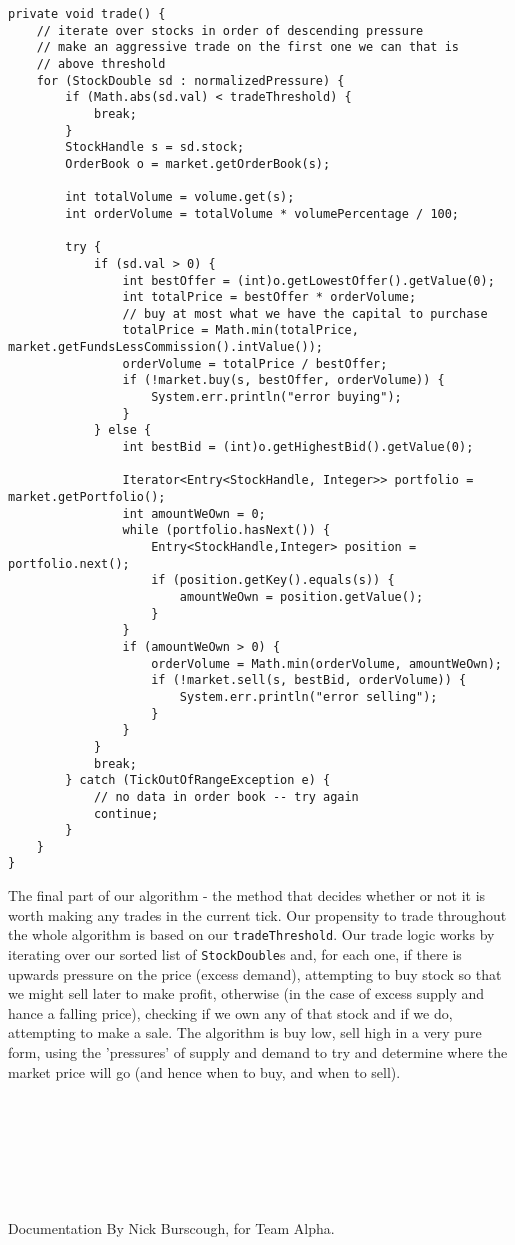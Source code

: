 \documentclass[11pt]{article}
\begin{document}
\begin{lstlisting}
private void trade() {
	// iterate over stocks in order of descending pressure
	// make an aggressive trade on the first one we can that is
	// above threshold
	for (StockDouble sd : normalizedPressure) {
		if (Math.abs(sd.val) < tradeThreshold) {
			break;
		}
		StockHandle s = sd.stock;
		OrderBook o = market.getOrderBook(s);
		
		int totalVolume = volume.get(s);
		int orderVolume = totalVolume * volumePercentage / 100;
		
		try {
			if (sd.val > 0) {
				int bestOffer = (int)o.getLowestOffer().getValue(0);
				int totalPrice = bestOffer * orderVolume;
				// buy at most what we have the capital to purchase
				totalPrice = Math.min(totalPrice, market.getFundsLessCommission().intValue());
				orderVolume = totalPrice / bestOffer;
				if (!market.buy(s, bestOffer, orderVolume)) {
					System.err.println("error buying");
				}
			} else {
				int bestBid = (int)o.getHighestBid().getValue(0);
				
				Iterator<Entry<StockHandle, Integer>> portfolio = market.getPortfolio();
				int amountWeOwn = 0;
				while (portfolio.hasNext()) {
					Entry<StockHandle,Integer> position = portfolio.next();
					if (position.getKey().equals(s)) {
						amountWeOwn = position.getValue();
					}
				}
				if (amountWeOwn > 0) {
					orderVolume = Math.min(orderVolume, amountWeOwn);
					if (!market.sell(s, bestBid, orderVolume)) {
						System.err.println("error selling");
					}
				}
			}	
			break;
		} catch (TickOutOfRangeException e) {
			// no data in order book -- try again
			continue; 
		}
	}
}
\end{lstlisting}
The final part of our algorithm - the method that decides whether or not it is worth making any trades in the current tick. Our propensity to trade throughout the whole algorithm is based on our \texttt{tradeThreshold}. Our trade logic works by iterating over our sorted list of \texttt{StockDouble}s and, for each one, if there is upwards pressure on the price (excess demand), attempting to buy stock so that we might sell later to make profit, otherwise (in the case of excess supply and hance a falling price), checking if we own any of that stock and if we do, attempting to make a sale. The algorithm is buy low, sell high in a very pure form, using the 'pressures' of supply and demand to try and determine where the market price will go (and hence when to buy, and when to sell).\\\\\\\\\\\\\\\\Documentation By Nick Burscough, for Team Alpha.
\end{document}
